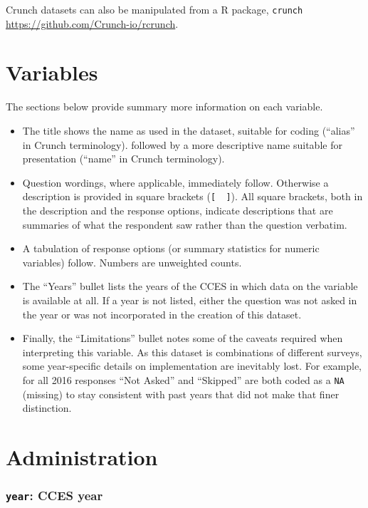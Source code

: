 \documentclass[10pt,article,oneside]{memoir}
\theoremstyle{definition}
\begin{document}
Crunch datasets can also be manipulated from a R package,
\texttt{crunch} \url{https://github.com/Crunch-io/rcrunch}.

\newpage

\hypertarget{variables}{%
\section{Variables}\label{variables}}

The sections below provide summary more information on each variable.

\begin{itemize}
\tightlist
\item
  The title shows the name as used in the dataset, suitable for coding
  (``alias'' in Crunch terminology). followed by a more descriptive name
  suitable for presentation (``name'' in Crunch terminology).
\item
  Question wordings, where applicable, immediately follow. Otherwise a
  description is provided in square brackets (\texttt{{[}\ \ {]}}). All
  square brackets, both in the description and the response options,
  indicate descriptions that are summaries of what the respondent saw
  rather than the question verbatim.
\item
  A tabulation of response options (or summary statistics for numeric
  variables) follow. Numbers are unweighted counts.
\item
  The ``Years'' bullet lists the years of the CCES in which data on the
  variable is available at all. If a year is not listed, either the
  question was not asked in the year or was not incorporated in the
  creation of this dataset.
\item
  Finally, the ``Limitations'' bullet notes some of the caveats required
  when interpreting this variable. As this dataset is combinations of
  different surveys, some year-specific details on implementation are
  inevitably lost. For example, for all 2016 responses ``Not Asked'' and
  ``Skipped'' are both coded as a \texttt{NA} (missing) to stay
  consistent with past years that did not make that finer distinction.
\end{itemize}

\hypertarget{administration}{%
\section{Administration}\label{administration}}

\hypertarget{year-cces-year}{%
\subsubsection{\texorpdfstring{\texttt{year}: CCES
year}{year: CCES year}}\label{year-cces-year}}
\end{document}

